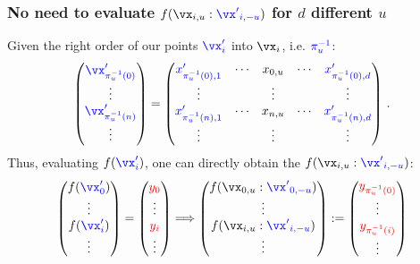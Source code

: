\documentclass[11pt,compress]{beamer} %
\begin{document}
\begin{frame}
\frametitle{No need to evaluate $f(\vx_{i,u}:{\color{blue}{\vx'}_{i,-u}})$ for $d$ 
different $u$}
Given the right order of our points $\color{blue}\vx'_i$ into $\vx_i$, i.e. $\color{blue}\pi^{-1}_u$:
\begin{equation*}
\begin{pmatrix}
{\color{blue}\vx'_{\pi^{-1}_u(0)}} \\
\vdots \\
{\color{blue}\vx'_{\pi^{-1}_u(n)}} \\
\vdots
\end{pmatrix}=
\begin{pmatrix}
{\color{blue}x'_{\pi^{-1}_u(0),1}} & \cdots & {x_{0,u}} & \cdots & {\color{blue}x'_{\pi^{-1}_u(0),d}} \\
\vdots & & \vdots & & \vdots \\
{\color{blue}x'_{\pi^{-1}_u(n),1}} & \cdots & x_{n,u} & \cdots & {\color{blue}x'_{\pi^{-1}_u(n),d}} \\
\vdots & & \vdots & & \vdots
\end{pmatrix}\, .
\end{equation*}
Thus, evaluating $f({\color{blue}\vx'_i})$, one can directly obtain the 
$f(\vx_{i,u}:{\color{blue}{\vx'}_{i,-u}})$:
\begin{equation*}
\begin{pmatrix}
f({\color{blue}\vx'_{0}}) \\
\vdots \\
f({\color{blue}\vx'_{i}}) \\
\vdots
\end{pmatrix}=
\begin{pmatrix}
\color{red} y_{0} \\
\vdots \\
\color{red} y_{i} \\
\vdots
\end{pmatrix} \Longrightarrow
\begin{pmatrix}
f(\vx_{0,u}:{\color{blue}{\vx'}_{0,-u}})\\
\vdots\\
f(\vx_{i,u}:{\color{blue}{\vx'}_{i,-u}})\\
\vdots\\
\end{pmatrix}:=
\begin{pmatrix}
\color{red} y_{\pi^{-1}_u(0)} \\
\vdots \\
\color{red} y_{\pi^{-1}_u(i)} \\
\vdots
\end{pmatrix}
\end{equation*}
\end{frame}
\end{document}
